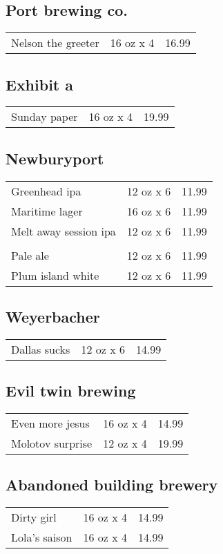 \documentclass{article}%
\begin{document}
\begin{multicols}{3}
%
\subsection*{Port brewing co.}%
\begin{tabular}{l c r}%
Nelson the greeter&16 oz x 4&16.99\\%
\end{tabular}

%
\subsection*{Exhibit a}%
\begin{tabular}{l c r}%
Sunday paper&16 oz x 4&19.99\\%
\end{tabular}

%
\subsection*{Newburyport}%
\begin{tabular}{l c r}%
Greenhead ipa&12 oz x 6&11.99\\%
Maritime lager&16 oz x 6&11.99\\%
\multirow{1}{15ex}{Melt away session ipa}&12 oz x 6&11.99\\%
&&\\%
Pale ale&12 oz x 6&11.99\\%
Plum island white&12 oz x 6&11.99\\%
\end{tabular}

%
\subsection*{Weyerbacher}%
\begin{tabular}{l c r}%
Dallas sucks&12 oz x 6&14.99\\%
\end{tabular}

%
\subsection*{Evil twin brewing}%
\begin{tabular}{l c r}%
Even more jesus&16 oz x 4&14.99\\%
Molotov surprise&12 oz x 4&19.99\\%
\end{tabular}

%
\subsection*{Abandoned building brewery}%
\begin{tabular}{l c r}%
Dirty girl&16 oz x 4&14.99\\%
Lola's saison&16 oz x 4&14.99\\%
\end{tabular}


\end{multicols}
\end{document}
